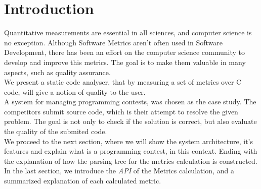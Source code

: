 \section{Introduction}
Quantitative measurements are essential in all sciences, and computer science is no exception.
Although Software Metrics aren't often used in Software Development, there has been an effort on the computer science community to develop and improve this metrics. 
The goal is to make them valuable in many aspects, such as quality assurance.\\
We present a static code analyser, that by measuring a set of metrics over C code, will give a notion of quality to the user.\\
A system for managing programming contests, was chosen as the case study.
The competitors submit source code, which is their attempt to resolve the given problem.
The goal is not only to check if the solution is correct, but also evaluate the quality of the submited code.\\
We proceed to the next section, where we will show the system architecture, it's features and explain what is a programming contest, in this context. Ending with the explanation of how the parsing tree for the metrics calculation is constructed.
In the last section, we introduce the \textit{API} of the Metrics calculation, and a summarized explanation of each calculated metric. 

